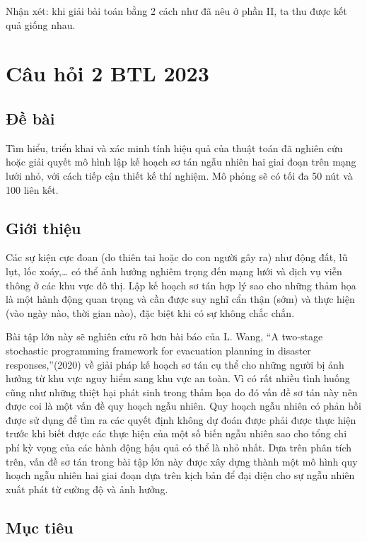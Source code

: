\documentclass[a4paper]{article}
\begin{document}
        Nhận xét: khi giải bài toán bằng 2 cách như đã nêu ở phần II, ta thu được kết quả giống nhau.

\section{Câu hỏi 2 BTL 2023}
    \subsection{Đề bài}
    Tìm hiểu, triển khai và xác minh tính hiệu quả của thuật toán đã nghiên cứu hoặc giải quyết mô hình lập kế hoạch sơ tán ngẫu nhiên hai giai đoạn trên mạng lưới nhỏ, với cách tiếp cận thiết kế thí nghiệm. Mô phỏng sẽ có tối đa 50 nút và 100 liên kết.
    
    \subsection{Giới thiệu}
    
    Các sự kiện cực đoan (do thiên tai hoặc do con người gây ra) như động đất, lũ lụt, lốc xoáy,… có thể ảnh hưởng nghiêm trọng đến mạng lưới và dịch vụ viễn thông ở các khu vực đô thị. 
    Lập kế hoạch sơ tán hợp lý sao cho những thảm họa là một hành động quan trọng và cần được suy nghĩ cẩn thận (sớm) và thực hiện (vào ngày nào, thời gian nào), đặc biệt khi có sự không chắc chắn. 
    
    Bài tập lớn này sẽ nghiên cứu rõ hơn bài báo của L. Wang, “A two-stage stochastic programming framework for evacuation planning in disaster responses,”(2020) về giải pháp kế hoạch sơ tán cụ thể cho những người bị ảnh hưởng từ khu vực nguy hiểm sang khu vực an toàn.
    Vì có rất nhiều tình huống cũng như những thiệt hại phát sinh trong thảm họa do đó vấn đề sơ tán này nên được coi là một vấn đề quy hoạch ngẫu nhiên.
    Quy hoạch ngẫu nhiên có phản hồi được sử dụng để tìm ra các quyết định không dự đoán được phải được thực hiện trước khi biết được các thực hiện của một số biến ngẫu nhiên sao cho tổng chi phí kỳ vọng của các hành động hậu quả có thể là nhỏ nhất.
    Dựa trên phân tích trên, vấn đề sơ tán trong bài tập lớn này được xây dựng thành một mô hình quy hoạch ngẫu nhiên hai giai đoạn dựa trên kịch bản để đại diện cho sự ngẫu nhiên xuất phát từ cường độ và ảnh hưởng.

    \subsection{Mục tiêu}
\end{document}
